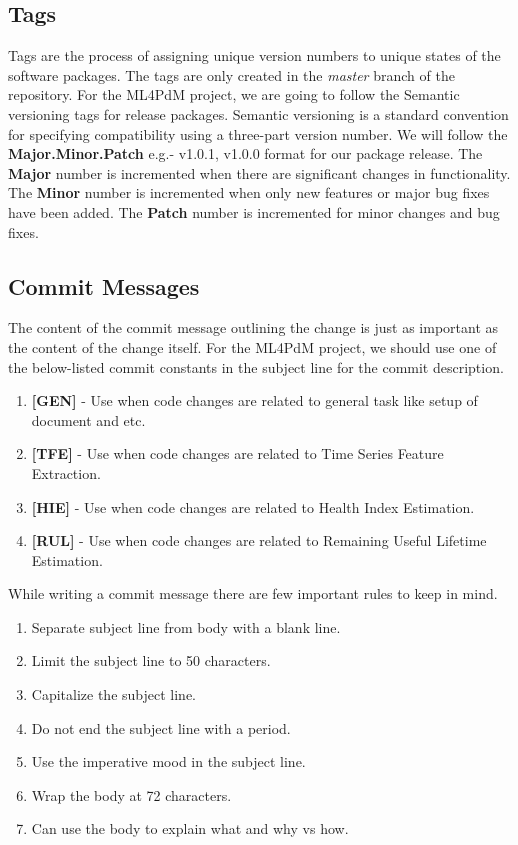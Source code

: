 \subsection{Tags}
Tags are the process of assigning unique version numbers to unique states of the software packages. The tags are only created in the \textit{master} branch of the repository. For the ML4PdM project, we are going to follow the Semantic versioning tags for release packages. Semantic versioning is a standard convention for specifying compatibility using a three-part version number. We will follow the \textbf{Major.Minor.Patch} e.g.- v1.0.1, v1.0.0 format for our package release. The \textbf{Major} number is incremented when there are significant changes in functionality. The \textbf{Minor} number is incremented when only new features or major bug fixes have been added. The \textbf{Patch} number is incremented for minor changes and bug fixes.

\subsection{Commit Messages}
The content of the commit message outlining the change is just as important as the content of the change itself. For the ML4PdM project, we should use one of the below-listed commit constants in the subject line for the commit description.
\begin{enumerate}
	\item \textbf{[GEN]} - Use when code changes are related to general task like setup of document and etc.
	\item \textbf{[TFE]} - Use when code changes are related to Time Series Feature Extraction.
	\item \textbf{[HIE]} - Use when code changes are related to Health Index Estimation.
	\item \textbf{[RUL]} - Use when code changes are related to Remaining Useful Lifetime Estimation.
\end{enumerate}
While writing a commit message there are few important rules to keep in mind.
\begin{enumerate}
	\item Separate subject line from body with a blank line.
	\item Limit the subject line to 50 characters.
	\item Capitalize the subject line.
	\item Do not end the subject line with a period.
	\item Use the imperative mood in the subject line.
	\item Wrap the body at 72 characters.
	\item Can use the body to explain what and why vs how.
\end{enumerate}


